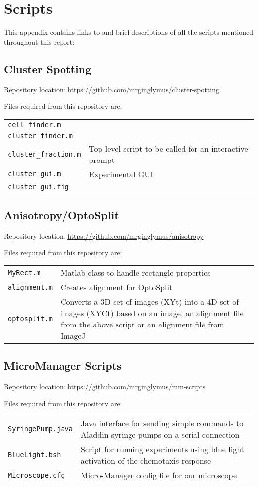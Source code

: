 \documentclass[../main.tex]{subfiles}
\begin{document}
\section{Scripts}

This appendix contains links to and brief descriptions of all the scripts mentioned throughout this report:

\subsection{Cluster Spotting}
\label{sec:scripts:clusters}
Repository location: \url{https://github.com/mrginglymus/cluster-spotting}

Files required from this repository are:


\begin{tabular}{ll}
\texttt{cell\_finder.m}	&	\\
\texttt{cluster\_finder.m}	&	\\
\texttt{cluster\_fraction.m}	&	Top level script to be called for an interactive prompt	\\
\texttt{cluster\_gui.m}		&	Experimental GUI \\
\texttt{cluster\_gui.fig}	&	
\end{tabular}

\subsection{Anisotropy/OptoSplit}
\label{sec:scripts:anisotropy}
Repository location: \url{https://github.com/mrginglymus/anisotropy}

Files required from this repository are:


\begin{tabular}{lp{12cm}}
\texttt{MyRect.m}	&	Matlab class to handle rectangle properties \\
\texttt{alignment.m}	&	Creates alignment for OptoSplit \\
\texttt{optosplit.m}	&	Converts a 3D set of images (XYt) into a 4D set of images (XYCt) based on an image, an alignment file from the above script or an alignment file from ImageJ
\end{tabular}

\subsection{MicroManager Scripts}
\label{sec:scripts:micromanager}

Repository location: \url{https://github.com/mrginglymus/mm-scripts}

Files required from this repository are:


\begin{tabular}{lp{12cm}}
\texttt{SyringePump.java}	&	Java interface for sending simple commands to Aladdin syringe pumps on a serial connection \\
\texttt{BlueLight.bsh}	&	Script for running experiments using blue light activation of the chemotaxis response \\
\texttt{Microscope.cfg}	&	Micro-Manager config file for our microscope
\end{tabular}
\end{document}
